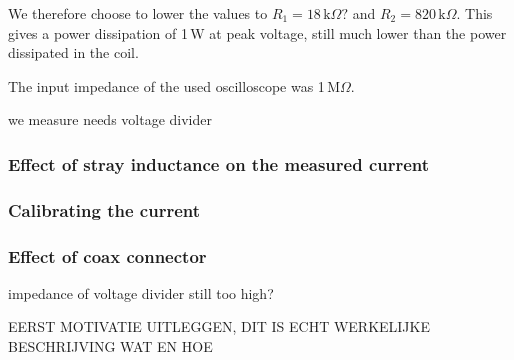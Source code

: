 
We therefore choose to lower the values to $R_1 = 18\,\mathrm{k}\Omega?$ 
and $R_2 = 820\,\mathrm{k}\Omega$. This gives a power dissipation of 1\,W 
at peak voltage, still much lower than the power dissipated in the coil.






The input impedance of the used oscilloscope was 1\,M$\Omega$.


we measure needs
voltage divider

\subsubsection{Effect of stray inductance on the measured current}

\subsubsection{Calibrating the current}

\subsubsection{Effect of coax connector}
impedance of voltage divider still too high?

EERST MOTIVATIE UITLEGGEN, DIT IS ECHT WERKELIJKE BESCHRIJVING WAT EN HOE


